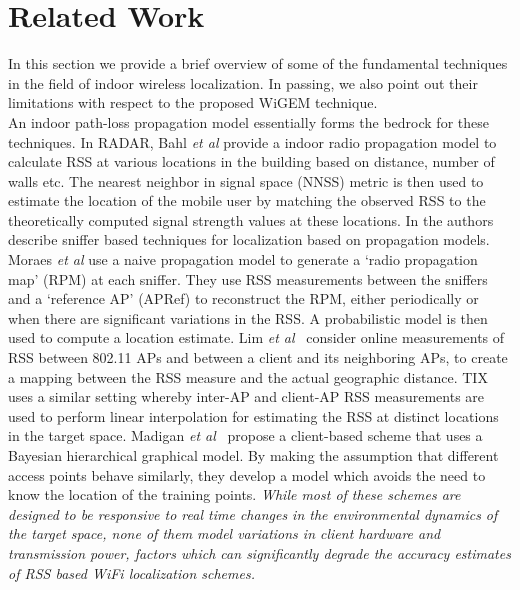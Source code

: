 \section{Related Work}
\label{sec:relatedwork}

In this section we provide a brief overview of some
of the fundamental techniques in the field of indoor wireless 
localization. In passing, we also point out their limitations
with respect to the proposed WiGEM technique. \\


 An indoor path-loss propagation model essentially forms the bedrock for these techniques. In RADAR, Bahl {\it et al} \cite{Bahl00radar:an} 
provide a indoor radio propagation model to calculate RSS at various locations in the building based on distance, number of walls etc. The nearest neighbor in signal space (NNSS) metric is then used to estimate the location of the  mobile user by matching the observed RSS to the theoretically computed signal strength values at these locations. In \cite{Moraes:2006:CWL:1164783.1164799, Lim:2010:ZIL:1741400.1741464} the authors describe sniffer based techniques for localization based on propagation models. Moraes {\it et al} \cite{Moraes:2006:CWL:1164783.1164799} use a naive propagation model to generate a `radio propagation map' (RPM) at each sniffer. They use RSS measurements between the sniffers and a `reference AP' (APRef) to reconstruct the RPM, either periodically or when there are significant variations in the RSS. A probabilistic model is then used to compute a location estimate.  Lim {\it et al}~\cite{Lim:2010:ZIL:1741400.1741464} consider online measurements of RSS between 802.11 APs and between a client and its neighboring APs, to create a mapping between the RSS measure and the actual geographic distance. TIX~\cite{Gwon:2004:ECC:1023783.1023786} uses a similar setting whereby inter-AP and client-AP RSS measurements are used to perform linear interpolation for estimating the RSS at distinct locations in the target space. Madigan {\it et al}~\cite{Madigan05bayesianindoor} propose a client-based scheme that uses a Bayesian hierarchical graphical model. By making the assumption that different access points behave similarly, they develop a model which avoids the need to know the location of the training points. {\it While most of these schemes are designed to be responsive to real time changes in the environmental dynamics of the target space, none of them model variations in client hardware and transmission power, factors which can significantly degrade the accuracy estimates of RSS based WiFi localization schemes.} \\

